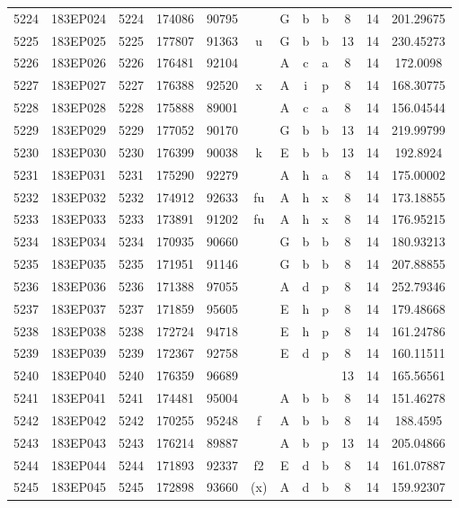 \begin{tabular}{|*{12}{c|}}
5224 & 183EP024 & 5224 & 174086 & 90795 &  & G & b & b & 8 & 14 & 201.29675 \\ 
5225 & 183EP025 & 5225 & 177807 & 91363 & u & G & b & b & 13 & 14 & 230.45273 \\ 
5226 & 183EP026 & 5226 & 176481 & 92104 &  & A & c & a & 8 & 14 & 172.0098 \\ 
5227 & 183EP027 & 5227 & 176388 & 92520 & x & A & i & p & 8 & 14 & 168.30775 \\ 
5228 & 183EP028 & 5228 & 175888 & 89001 &  & A & c & a & 8 & 14 & 156.04544 \\ 
5229 & 183EP029 & 5229 & 177052 & 90170 &  & G & b & b & 13 & 14 & 219.99799 \\ 
5230 & 183EP030 & 5230 & 176399 & 90038 & k & E & b & b & 13 & 14 & 192.8924 \\ 
5231 & 183EP031 & 5231 & 175290 & 92279 &  & A & h & a & 8 & 14 & 175.00002 \\ 
5232 & 183EP032 & 5232 & 174912 & 92633 & fu & A & h & x & 8 & 14 & 173.18855 \\ 
5233 & 183EP033 & 5233 & 173891 & 91202 & fu & A & h & x & 8 & 14 & 176.95215 \\ 
5234 & 183EP034 & 5234 & 170935 & 90660 &  & G & b & b & 8 & 14 & 180.93213 \\ 
5235 & 183EP035 & 5235 & 171951 & 91146 &  & G & b & b & 8 & 14 & 207.88855 \\ 
5236 & 183EP036 & 5236 & 171388 & 97055 &  & A & d & p & 8 & 14 & 252.79346 \\ 
5237 & 183EP037 & 5237 & 171859 & 95605 &  & E & h & p & 8 & 14 & 179.48668 \\ 
5238 & 183EP038 & 5238 & 172724 & 94718 &  & E & h & p & 8 & 14 & 161.24786 \\ 
5239 & 183EP039 & 5239 & 172367 & 92758 &  & E & d & p & 8 & 14 & 160.11511 \\ 
5240 & 183EP040 & 5240 & 176359 & 96689 &  &  &  &  & 13 & 14 & 165.56561 \\ 
5241 & 183EP041 & 5241 & 174481 & 95004 &  & A & b & b & 8 & 14 & 151.46278 \\ 
5242 & 183EP042 & 5242 & 170255 & 95248 & f & A & b & b & 8 & 14 & 188.4595 \\ 
5243 & 183EP043 & 5243 & 176214 & 89887 &  & A & b & p & 13 & 14 & 205.04866 \\ 
5244 & 183EP044 & 5244 & 171893 & 92337 & f2 & E & d & b & 8 & 14 & 161.07887 \\ 
5245 & 183EP045 & 5245 & 172898 & 93660 & (x) & A & d & b & 8 & 14 & 159.92307 \\ 

\end{tabular}
